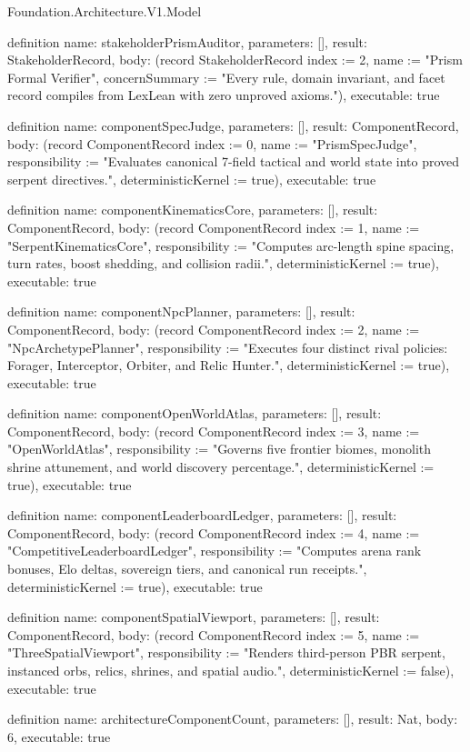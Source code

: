 \begin{lexlean}{Foundation.Architecture.V1.Model}
\begin{semanticmodule}
definition{
  name: stakeholderPrismAuditor,
  parameters: [],
  result: StakeholderRecord,
  body: (record StakeholderRecord {index := 2, name := "Prism Formal Verifier", concernSummary := "Every rule, domain invariant, and facet record compiles from LexLean with zero unproved axioms."}),
  executable: true
}

definition{
  name: componentSpecJudge,
  parameters: [],
  result: ComponentRecord,
  body: (record ComponentRecord {index := 0, name := "PrismSpecJudge", responsibility := "Evaluates canonical 7-field tactical and world state into proved serpent directives.", deterministicKernel := true}),
  executable: true
}

definition{
  name: componentKinematicsCore,
  parameters: [],
  result: ComponentRecord,
  body: (record ComponentRecord {index := 1, name := "SerpentKinematicsCore", responsibility := "Computes arc-length spine spacing, turn rates, boost shedding, and collision radii.", deterministicKernel := true}),
  executable: true
}

definition{
  name: componentNpcPlanner,
  parameters: [],
  result: ComponentRecord,
  body: (record ComponentRecord {index := 2, name := "NpcArchetypePlanner", responsibility := "Executes four distinct rival policies: Forager, Interceptor, Orbiter, and Relic Hunter.", deterministicKernel := true}),
  executable: true
}

definition{
  name: componentOpenWorldAtlas,
  parameters: [],
  result: ComponentRecord,
  body: (record ComponentRecord {index := 3, name := "OpenWorldAtlas", responsibility := "Governs five frontier biomes, monolith shrine attunement, and world discovery percentage.", deterministicKernel := true}),
  executable: true
}

definition{
  name: componentLeaderboardLedger,
  parameters: [],
  result: ComponentRecord,
  body: (record ComponentRecord {index := 4, name := "CompetitiveLeaderboardLedger", responsibility := "Computes arena rank bonuses, Elo deltas, sovereign tiers, and canonical run receipts.", deterministicKernel := true}),
  executable: true
}

definition{
  name: componentSpatialViewport,
  parameters: [],
  result: ComponentRecord,
  body: (record ComponentRecord {index := 5, name := "ThreeSpatialViewport", responsibility := "Renders third-person PBR serpent, instanced orbs, relics, shrines, and spatial audio.", deterministicKernel := false}),
  executable: true
}

definition{
  name: architectureComponentCount,
  parameters: [],
  result: Nat,
  body: 6,
  executable: true
}


\end{semanticmodule}
\end{lexlean}

